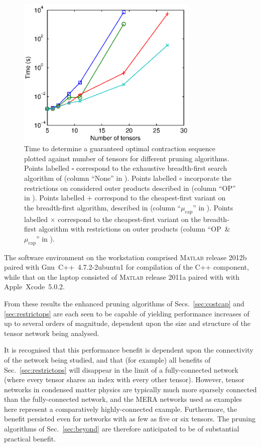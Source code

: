 \documentclass[aps,pre,reprint,superscriptaddress,amsfonts,amsmath,showpacs,nofootinbib,floatfix]{revtex4-1}
\newcommand{\mrm}[1]{\mathrm{#1}}
\newcommand{\sref}[1]{Sec.~\ref{#1}}
\newcommand{\ptref}[1]{\protect{Table~\ref{#1}}}
\newcommand{\psref}[1]{\protect{Sec.~\ref{#1}}}
\newcommand{\MATLAB}{\textsc{Matlab}}
\begin{document}
\begin{figure}
\includegraphics[width=246.0pt]{results}
\caption{Time to determine a guaranteed optimal contraction sequence plotted against number of tensors for different pruning algorithms. Points labelled $\square$ correspond to the exhaustive breadth-first search algorithm of \psref{sec:breadthalg} (column ``None'' in \ptref{tab:results}). Points labelled $\circ$ incorporate the restrictions on considered outer products described in \psref{sec:restrictops} (column ``OP'' in \ptref{tab:results}). Points labelled $+$ correspond to the cheapest-first variant on the breadth-first algorithm, described in \psref{sec:costcap} (column ``$\mu_\mrm{cap}$'' in \ptref{tab:results}). Points labelled $\times$ correspond to the cheapest-first variant on the breadth-first algorithm with restrictions on outer products (column ``OP~\&~$\mu_\mrm{cap}$'' in \ptref{tab:results}).\label{fig:results}}
\end{figure}%


The software environment on the workstation comprised \MATLAB{} release 2012b paired with Gnu~C++~4.7.2-2ubuntu1
for compilation of the C++ component, while that on the laptop consisted of \MATLAB{} release 2011a paired with with Apple~Xcode~5.0.2. 

From these results the enhanced pruning algorithms of Secs.~\ref{sec:costcap} and \ref{sec:restrictops} are each seen to be  capable of yielding performance increases of up to several orders of magnitude, dependent upon the size and structure of the tensor network being analysed. 

It is recognised that this performance benefit is dependent upon the connectivity of the network being studied, and that (for example) all benefits of \sref{sec:restrictops} will disappear in the limit of a fully-connected network (where every tensor shares an index with every other tensor). However, tensor networks in condensed matter physics are typically much more sparsely connected than the fully-connected network, and the MERA networks used as examples here represent a comparatively highly-connected example. Furthermore, the benefit persisted even for networks with as few as five or six tensors. %
The pruning algorithms of \sref{sec:beyond} %
are therefore anticipated to be of substantial practical benefit. %
\end{document}
